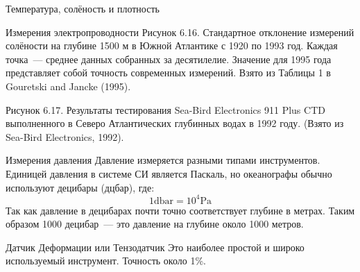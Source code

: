 \begin{chapter}{Температура, солёность и плотность}
\begin{section}{Измерения электропроводности}
Рисунок 6.16. Стандартное отклонение измерений солёности на глубине
1500 м в Южной Атлантике с 1920 по 1993 год. Каждая точка~--- среднее
данных собранных за десятилелие. Значение для 1995 года представляет
собой точность современных измерений. Взято из Таблицы 1 в Gouretski
and Jancke (1995).

Рисунок 6.17. Результаты тестирования Sea-Bird Electronics 911 Plus
CTD выполненного в Северо Атлантических глубинных водах в 1992
году. (Взято из Sea-Bird Electronics, 1992).
\end{section}

\begin{section}{Измерения давления}
Давление измеряется разными типами инструментов. Единицей давления в
системе СИ является Паскаль, но океанографы обычно используют децибары
(дцбар), где:
\begin{equation}
1 \text{dbar} = 10^4 \text{Pa}
\end{equation}
Так как давление в децибарах почти точно соответствует глубине в
метрах. Таким образом 1000 децибар~--- это давление на глубине около
1000 метров.
%


\begin{paragraph}{Датчик Деформации или Тензодатчик}
Это наиболее простой и широко используемый инструмент. Точность около
1\%.
%
\end{paragraph}


\end{section}
\end{chapter}
